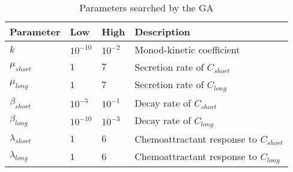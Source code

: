 \begin{table}[ht]
\caption{Parameters searched by the GA} %
\centering
\begin{footnotesize}
\begin{tabular}{l l l l}
\hline
Parameter        & Low & High & Description\\ \hline \hline
$k$              & $10^{-10}$ & $10^{-2}$ & Monod-kinetic coefficient \\
$\mu_{short}$     & $1$ & $7$             & Secretion rate of $C_{short}$ \\
$\mu_{long}$      & $1$ & $7$             & Secretion rate of $C_{long}$ \\
$\beta_{short}$   & $10^{-5}$ & $10^{-1}$  & Decay rate of $C_{short}$ \\
$\beta_{long}$    & $10^{-10}$ & $10^{-3}$ & Decay rate of $C_{long}$ \\
$\lambda_{short}$ & $1$ & $6$             & Chemoattractant response to $C_{short}$ \\
$\lambda_{long}$  & $1$ & $6$             & Chemoattractant response to $C_{long}$ \\
\hline
\end{tabular}
\end{footnotesize}
\label{unknownparameters}
\end{table}


